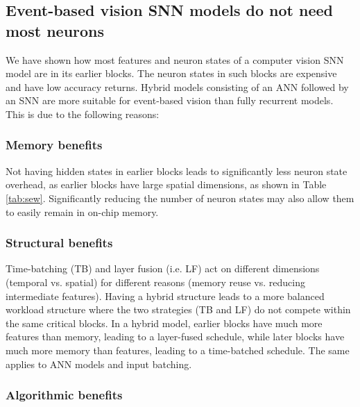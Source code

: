 \subsection*{Event-based vision SNN models do not need most neurons}

We have shown how most features and neuron states of a computer vision SNN model are in its earlier blocks. The neuron states in such blocks are expensive and have low accuracy returns. Hybrid models consisting of an ANN followed by an SNN are more suitable for event-based vision than fully recurrent models. This is due to the following reasons:

\subsubsection*{Memory benefits}

Not having hidden states in earlier blocks leads to significantly less neuron state overhead, as earlier blocks have large spatial dimensions, as shown in Table \ref{tab:sew}. Significantly reducing the number of neuron states may also allow them to easily remain in on-chip memory.

\subsubsection*{Structural benefits}

Time-batching (TB) and layer fusion (i.e. LF) act on different dimensions (temporal vs. spatial) for different reasons (memory reuse vs. reducing intermediate features). Having a hybrid structure leads to a more balanced workload structure where the two strategies (TB and LF) do not compete within the same critical blocks. In a hybrid model, earlier blocks have much more features than memory, leading to a layer-fused schedule, while later blocks have much more memory than features, leading to a time-batched schedule. The same applies to ANN models and input batching.

\subsubsection*{Algorithmic benefits}

